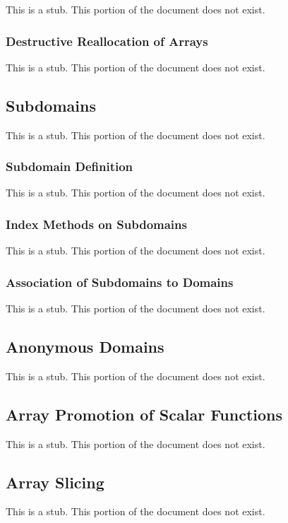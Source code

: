 This is a stub.  This portion of the document does not exist.

\subsubsection{Destructive Reallocation of Arrays}
\label{Destructive_Reallocation_of_Arrays}

This is a stub.  This portion of the document does not exist.

\subsection{Subdomains}
\label{Subdomains}

This is a stub.  This portion of the document does not exist.

\subsubsection{Subdomain Definition}
\label{Subdomain_Definition}

This is a stub.  This portion of the document does not exist.

\subsubsection{Index Methods on Subdomains}
\label{Index_Methods_on_Subdomains}

This is a stub.  This portion of the document does not exist.

\subsubsection{Association of Subdomains to Domains}
\label{Association_of_Subdomains_to_Domains}

This is a stub.  This portion of the document does not exist.

\subsection{Anonymous Domains}
\label{Anonymous_Domains}

This is a stub.  This portion of the document does not exist.

\subsection{Array Promotion of Scalar Functions}
\label{Array_Promotion_of_Scalar_Functions}

This is a stub.  This portion of the document does not exist.

\subsection{Array Slicing}
\label{Array_Slicing}

This is a stub.  This portion of the document does not exist.
